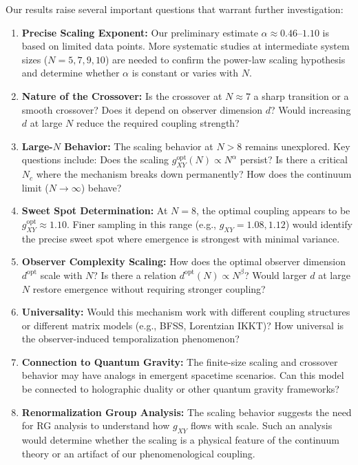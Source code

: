 \documentclass[12pt,a4paper]{article}
\begin{document}
Our results raise several important questions that warrant further investigation:

\begin{enumerate}[leftmargin=*]
\item \textbf{Precise Scaling Exponent:}
Our preliminary estimate $\alpha \approx 0.46$--$1.10$ is based on limited
data points. More systematic studies at intermediate system sizes
($N=5, 7, 9, 10$) are needed to confirm the power-law scaling hypothesis
and determine whether $\alpha$ is constant or varies with $N$.

\item \textbf{Nature of the Crossover:}
Is the crossover at $N \approx 7$ a sharp transition or a smooth crossover?
Does it depend on observer dimension $d$? Would increasing $d$ at large $N$
reduce the required coupling strength?

\item \textbf{Large-$N$ Behavior:}
The scaling behavior at $N > 8$ remains unexplored. Key questions include:
Does the scaling $g_{XY}^{\text{opt}}(N) \propto N^\alpha$ persist? Is there
a critical $N_c$ where the mechanism breaks down permanently? How does the
continuum limit ($N \rightarrow \infty$) behave?

\item \textbf{Sweet Spot Determination:}
At $N=8$, the optimal coupling appears to be $g_{XY}^{\text{opt}} \approx 1.10$.
Finer sampling in this range (e.g., $g_{XY} = 1.08, 1.12$) would identify
the precise sweet spot where emergence is strongest with minimal variance.

\item \textbf{Observer Complexity Scaling:}
How does the optimal observer dimension $d^{\text{opt}}$ scale with $N$?
Is there a relation $d^{\text{opt}}(N) \propto N^\beta$? Would larger $d$
at large $N$ restore emergence without requiring stronger coupling?

\item \textbf{Universality:}
Would this mechanism work with different coupling structures or different
matrix models (e.g., BFSS, Lorentzian IKKT)? How universal is the
observer-induced temporalization phenomenon?

\item \textbf{Connection to Quantum Gravity:}
The finite-size scaling and crossover behavior may have analogs in emergent
spacetime scenarios. Can this model be connected to holographic duality or
other quantum gravity frameworks?

\item \textbf{Renormalization Group Analysis:}
The scaling behavior suggests the need for RG analysis to understand how
$g_{XY}$ flows with scale. Such an analysis would determine whether the
scaling is a physical feature of the continuum theory or an artifact of
our phenomenological coupling.


\end{enumerate}
\end{document}
